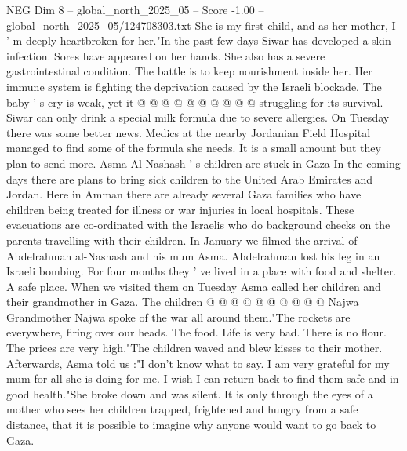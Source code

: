\begin{textsample}{NEG Dim 8 – global\_north\_2025\_05 – Score -1.00 – global\_north\_2025\_05/124708303.txt}
She is my first child, and as her mother, I ' m deeply heartbroken for her."In the past few days Siwar has developed a skin infection.
Sores have appeared on her hands.
She also has a severe gastrointestinal condition.
The battle is to keep nourishment inside her.
Her immune system is fighting the deprivation caused by the Israeli blockade.
The baby ' s cry is weak, yet it @ @ @ @ @ @ @ @ @ @ struggling for its survival.
Siwar can only drink a special milk formula due to severe allergies.
On Tuesday there was some better news.
Medics at the nearby Jordanian Field Hospital managed to find some of the formula she needs.
It is a small amount but they plan to send more.
Asma Al-Nashash ' s children are stuck in Gaza In the coming days there are plans to bring sick children to the United Arab Emirates and Jordan.
Here in Amman there are already several Gaza families who have children being treated for illness or war injuries in local hospitals.
These evacuations are co-ordinated with the Israelis who do background checks on the parents travelling with their children.
In January we filmed the arrival of Abdelrahman al-Nashash and his mum Asma.
Abdelrahman lost his leg in an Israeli bombing.
For four months they ' ve lived in a place with food and shelter.
A safe place.
When we visited them on Tuesday Asma called her children and their grandmother in Gaza.
The children @ @ @ @ @ @ @ @ @ @ Najwa Grandmother Najwa spoke of the war all around them."The rockets are everywhere, firing over our heads.
The food.
Life is very bad.
There is no flour.
The prices are very high."The children waved and blew kisses to their mother.
Afterwards, Asma told us :"I don't know what to say.
I am very grateful for my mum for all she is doing for me.
I wish I can return back to find them safe and in good health."She broke down and was silent.
It is only through the eyes of a mother who sees her children trapped, frightened and hungry from a safe distance, that it is possible to imagine why anyone would want to go back to Gaza.

\end{textsample}
